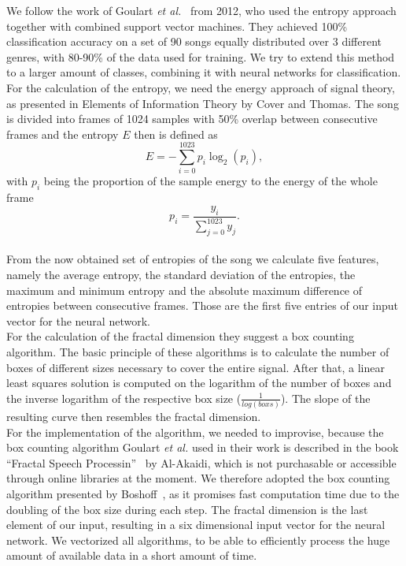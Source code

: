 We follow the work of Goulart \textit{et al.}~\cite{entropy} from 2012,
who used the entropy approach together with combined support vector
machines. They achieved 100\% classification accuracy on a set of 90
songs equally distributed over 3 different genres, with 80-90\% of the
data used for training. We try to extend this method to a larger amount
of classes, combining it with neural networks for classification.\\
For the calculation of the entropy, we need the energy approach of
signal theory, as presented in Elements of Information Theory
\cite{infotheo} by Cover and Thomas. The song is divided into frames of
1024 samples with 50\% overlap between consecutive frames and the
entropy $E$ then is defined as
\begin{equation}
	E = - \sum_{i=0}^{1023} p_{i} \log_{2}(p_{i}),
\end{equation}
with $p_{i}$ being the proportion of the sample energy to the
energy of the whole frame
\begin{equation}
	p_i = \frac{y_i}{\sum_{j=0}^{1023} y_j}.
\end{equation}
\\
\noindent From the now obtained set of entropies of the song we
calculate five features, namely the average entropy, the standard
deviation of the entropies, the maximum and minimum entropy and the
absolute maximum difference of entropies between consecutive frames.
Those are the first five entries of our input vector for the neural
network.\\
For the calculation of the fractal dimension they suggest a box counting
algorithm. The basic principle of these algorithms is to calculate the
number of boxes of different sizes necessary to cover the entire signal.
After that, a linear least squares solution is computed on the logarithm
of the number of boxes and the inverse logarithm of the respective box
size ($\frac{1}{log(boxs)}$). The slope of the resulting curve then
resembles the fractal dimension.\\
For the implementation of the algorithm, we needed to improvise, because
the box counting algorithm Goulart \textit{et al.} used in their work is
described in the book ``Fractal Speech Processin''~\cite{fractal} by
Al-Akaidi, which is not purchasable or accessible through online
libraries at the moment. We therefore adopted the box counting algorithm
presented by Boshoff~\cite{boxcount}, as it promises fast computation
time due to the doubling of the box size during each step. The fractal
dimension is the last element of our input, resulting in a six
dimensional input vector for the neural network. We vectorized all
algorithms, to be able to efficiently process the huge amount of
available data in a short amount of time.

